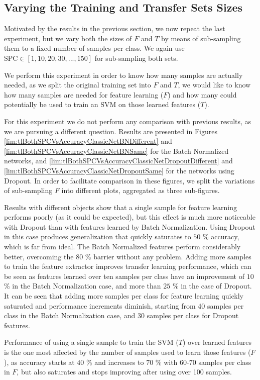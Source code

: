 \FloatBarrier
\subsection{Varying the Training and Transfer Sets Sizes}

Motivated by the results in the previous section, we now repeat the last experiment, but we vary both the sizes of $F$ and $T$ by means of sub-sampling them to a fixed number of samples per class. We again use $\text{SPC} \in [1,10, 20, 30, ..., 150]$ for sub-sampling both sets.

We perform this experiment in order to know how many samples are actually needed, as we split the original training set into $F$ and $T$, we would like to know how many samples are needed for feature learning ($F$) and how many could potentially be used to train an SVM on those learned features ($T$).

For this experiment we do not perform any comparison with previous results, as we are pursuing a different question. Results are presented in Figures \ref{lim:tlBothSPCVsAccuracyClassicNetBNDifferent} and \ref{lim:tlBothSPCVsAccuracyClassicNetBNSame} for the Batch Normalized networks, and \ref{lim:tlBothSPCVsAccuracyClassicNetDropoutDifferent} and \ref{lim:tlBothSPCVsAccuracyClassicNetDropoutSame} for the networks using Dropout. In order to facilitate comparison in these figures, we split the variations of sub-sampling $F$ into different plots, aggregated as three sub-figures.

Results with different objects show that a single sample for feature learning performs poorly (as it could be expected), but this effect is much more noticeable with Dropout than with features learned by Batch Normalization. Using Dropout in this case produces generalization that quickly saturates to $50$ \% accuracy, which is far from ideal. The Batch Normalized features perform considerably better, overcoming the $80$ \% barrier without any problem.
Adding more samples to train the feature extractor improves transfer learning performance, which can be seen as features learned over ten samples per class have an improvement of $10$ \% in the Batch Normalization case, and more than $25$ \% in the case of Dropout. It can be seen that adding more samples per class for feature learning quickly saturated and performance increments diminish, starting from 40 samples per class in the Batch Normalization case, and 30 samples per class for Dropout features.

Performance of using a single sample to train the SVM ($T$) over learned features is the one most affected by the number of samples used to learn those features ($F$), as accuracy starts at $40$ \% and increases to $70$ \% with 60-70 samples per class in $F$, but also saturates and stops improving after using over 100 samples.

